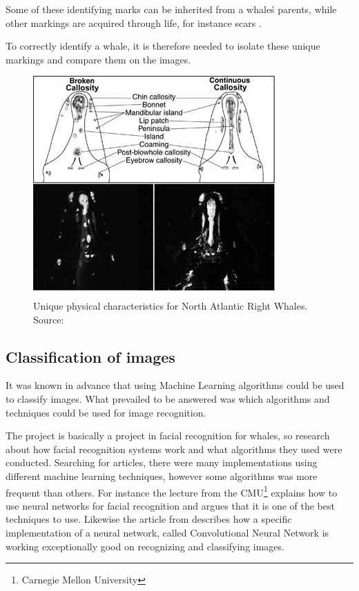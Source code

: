 Some of these identifying marks can be inherited from a whale\'s parents, while other markings are acquired through life, for instance scars \cite{neaq:whale-identity-markings}. 

To correctly identify a whale, it is therefore needed to isolate these unique markings and compare them on the images. 

\begin{figure}
	\centering
	\includegraphics[width=\linewidth]{Images/callosity_comparison}
	\caption{Unique physical characteristics for North Atlantic Right Whales. Source: \cite{neaq:whale-identity}}
	\label{fig:whale-collosity}
\end{figure}

\subsection{Classification of images}
It was known in advance that using Machine Learning algorithms could be used to classify images. What prevailed to be answered was which algorithms and techniques could be used for image recognition. 

The project is basically a project in facial recognition for whales, so research about how facial recognition systems work and what algorithms they used were conducted. Searching for articles, there were many implementations using different machine learning techniques, however some algorithms was more frequent than others. For instance the lecture from the CMU\footnote{Carnegie Mellon University} \cite{lit:nn1} explains how to use neural networks for facial recognition and argues that it is one of the best techniques to use. Likewise the article from \cite{lit:nn2} describes how a specific implementation of a neural network, called Convolutional Neural Network is working exceptionally good on recognizing and classifying images. 

